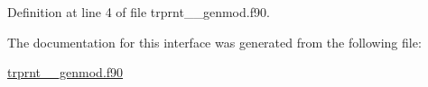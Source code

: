 Definition at line 4 of file trprnt\+\_\+\+\_\+genmod.\+f90.



The documentation for this interface was generated from the following file\+:\begin{DoxyCompactItemize}
\item 
\hyperlink{trprnt____genmod_8f90}{trprnt\+\_\+\+\_\+genmod.\+f90}\end{DoxyCompactItemize}
